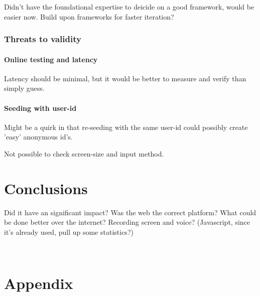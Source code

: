 \documentclass[nofilelist,dvipsnames]{cslthse-msc}
\begin{document}
          Didn't have the foundational expertise to deicide on a good
          framework, would be easier now.
          Build upon frameworks for faster iteration?

			\subsection{Threats to validity}

        \subsubsection{Online testing and latency}

          Latency should be minimal, but it would be better to measure and
          verify than simply guess.

        \subsubsection{Seeding with user-id}

          Might be a quirk in that re-seeding with the same user-id could
          possibly create 'easy' anonymous id's.

        Not possible to check screen-size and input method.






	\chapter{Conclusions}

		Did it have an significant impact? Was the web the correct platform? What
		could be done better over the internet? Recording screen and voice?
		(Javascript, since it's already used, pull up some statistics?)


	\checkoddpage
	\ifoddpage
	\else
		 \newpage
		 \thispagestyle{empty}
		 \mbox{ }
	\fi

  \chapter{Appendix}
\end{document}
